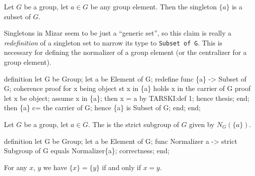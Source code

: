 \begin{definition*}
Let $G$ be a group, let $a\in G$ be any group element. Then the
singleton $\{a\}$ is a subset of $G$.
\end{definition*}

\begin{def-remark}
Singletons in Mizar seem to be just a ``generic set'', so this claim is
really a \emph{redefinition} of a singleton set to narrow its type to
\lstinline{Subset of G}. This is necessary for defining the normalizer
of a group element (or the centralizer for a group element).
\end{def-remark}

\nwenddocs{}\endmoddef\nwstartdeflinemarkup{}\nwenddeflinemarkup
definition
  let G be Group;
  let a be Element of G;
  redefine func \{a\} -> Subset of G;
  coherence
  proof
    for x being object st x in \{a\}
    holds x in the carrier of G
    proof
      let x be object;
      assume x in \{a\};
      then x = a by TARSKI:def 1;
      hence thesis;
    end;
    then \{a\} c= the carrier of G;
    hence \{a\} is Subset of G;
  end;
end;
\nwendcode{}\nwdocspar

\begin{definition*}
Let $G$ be a group, let $a\in G$. The  is the
strict subgroup of $G$ given by $N_{G}(\{a\})$.
\end{definition*}

\nwenddocs{}\endmoddef\nwstartdeflinemarkup{}\nwenddeflinemarkup
definition
  let G be Group;
  let a be Element of G;
  func Normalizer a -> strict Subgroup of G equals
  Normalizer\{a\};
  correctness;
end;
\nwendcode{}\nwdocspar

\begin{theorem}
For any $x$, $y$ we have $\{x\}=\{y\}$ if and only if $x=y$.
\end{theorem}

